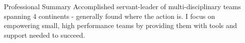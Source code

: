 \documentclass{resume} %
\begin{document}
\vspace{1em}

\begin{rSection}{Professional Summary}
Accomplished servant-leader of multi-disciplinary teams spanning 4
continents - generally found where the action is. I focus on empowering small, high performance teams by
providing them with tools and support needed to succeed.
\end{rSection}

\end{document}
